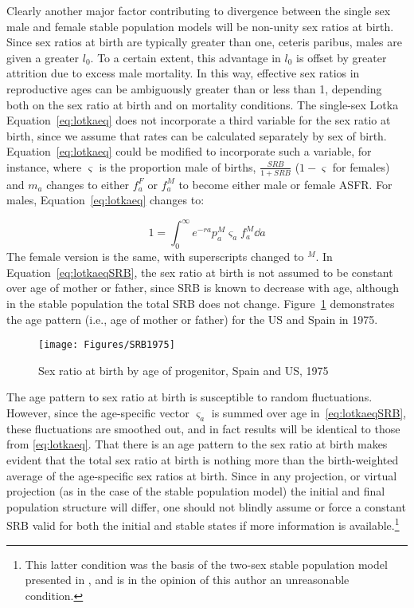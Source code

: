  \FloatBarrier
Clearly another major factor contributing to divergence between the single sex
male and female stable population models will be non-unity sex ratios at
birth. Since sex ratios at birth are typically greater than one, ceteris paribus, males
are given a greater $l_0$. To a certain extent, this advantage in $l_0$ is
offset by greater attrition due to excess male mortality. In this way, effective
sex ratios in reproductive ages can be ambiguously greater than or less than 1,
depending both on the sex ratio at birth and on mortality conditions. The
single-sex Lotka Equation~\eqref{eq:lotkaeq} does not incorporate a third
variable for the sex ratio at birth, since we assume that rates can be
calculated separately by sex of birth. Equation~\eqref{eq:lotkaeq} could be
modified to incorporate such a variable, for instance, where $\varsigma$ is the
proportion male of births, $\tfrac{SRB}{1+SRB}$ ($1 - \varsigma$ for
females) and $m_a$ changes to either $f_a^F$ or $f_a^M$ to become either male
or female ASFR. For males, Equation~\ref{eq:lotkaeq} changes to:

\begin{equation}
\label{eq:lotkaeqSRB}
1 = \int _0 ^\infty e^{-ra}p_a^M \varsigma_a f_a^M \dd a 
\end{equation}
The female version is the same, with superscripts changed to $^M$. In
Equation~\eqref{eq:lotkaeqSRB}, the sex ratio at birth is not assumed to
be constant over age of mother or father, since SRB is known to decrease with
age, although in the stable population the total SRB does not change. Figure~\ref{fig:SRB1975}
demonstrates the age pattern (i.e., age of mother or father) for the US and
Spain in 1975.

\begin{figure}[ht!]
        \centering  
          \caption{Sex ratio at birth by age of progenitor, Spain
          and US, 1975}
           \texttt{[image: Figures/SRB1975]}
          \label{fig:SRB1975}
\end{figure}

The age pattern to sex ratio at birth is susceptible to random
fluctuations. However, since the age-specific vector $\varsigma _a$ is summed
over age in~\eqref{eq:lotkaeqSRB}, these fluctuations are smoothed out, and in
fact results will be identical to those from \eqref{eq:lotkaeq}. That there is
an age pattern to the sex ratio at birth makes evident that the total sex ratio 
at birth is nothing more than the birth-weighted
average of the age-specific sex ratios at birth. Since in any projection, or virtual projection
(as in the case of the stable population model) the initial and final population 
structure will differ, one should not blindly assume or force a constant SRB valid 
for both the initial and stable states
if more information is available.\footnote{This latter condition was the basis
of the two-sex stable population model presented in \citet{mitra1982alternative,mitra1978derivation,mitra1976effect}, and is in the
opinion of this author an unreasonable condition.}

